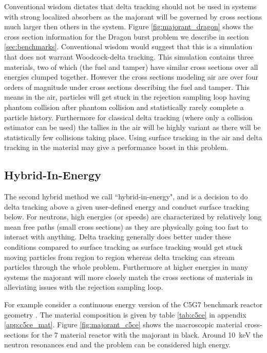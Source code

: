 Conventional wisdom dictates that delta tracking should not be used in systems with strong localized absorbers as the majorant will be governed by cross sections much larger then others in the system.
Figure \ref{fig:majorant_dragon} shows the cross section information for the Dragon burst problem we describe in section \ref{sec:benchmarks}.
Conventional wisdom would suggest that this is a simulation that does not warrant Woodcock-delta tracking.
This simulation contains three materials, two of which (the fuel and tamper) have similar cross sections over all energies clumped together.
However the cross sections modeling air are over four orders of magnitude under cross sections describing the fuel and tamper.
This means in the air, particles will get stuck in the rejection sampling loop having phantom collision after phantom collision and statistically rarely complete a particle history.
Furthermore for classical delta tracking (where only a collision estimator can be used) the tallies in the air will be highly variant as there will be statistically few collisions taking place.
Using surface tracking in the air and delta tracking in the material may give a performance boost in this problem.

\subsection{Hybrid-In-Energy}
\label{sec:cutoff}

The second hybrid method we call ``hybrid-in-energy", and is a decision to do delta tracking above a given user-defined energy and conduct surface tracking below.
For neutrons, high energies (or speeds) are characterized by relatively long mean free paths (small cross sections) as they are physically going too fast to interact with anything.
Delta tracking generally does better under these conditions compared to surface tracking as surface tracking would get stuck moving particles from region to region whereas delta tracking can stream particles through the whole problem.
Furthermore at higher energies in many systems the majorant will more closely match the cross sections of materials in alleviating issues with the rejection sampling loop.

For example consider a continuous energy version of the C5G7 benchmark reactor geometry \cite{jia_hou_oecdnea_2017}.
The material composition is given by table \ref{tab:c5ce} in appendix \ref{app:c5ce_mat}.
Figure \ref{fig:majorant_c5ce} shows the macroscopic material cross-sections for the 7 material reactor with the majorant in black.
Around \SI{10}{\kilo\electronvolt} the neutron resonances end and the problem can be considered high energy.

